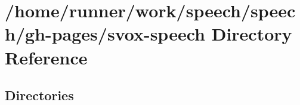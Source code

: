 \section{/home/runner/work/speech/speech/gh-\/pages/svox-\/speech Directory Reference}
\label{dir_d72f5e6576561e2760cbc15994dfd336}
\subsection*{Directories}
\begin{DoxyCompactItemize}
\end{DoxyCompactItemize}
